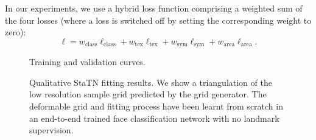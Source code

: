 \documentclass[runningheads]{llncs}
\begin{document}
In our experiments, we use a hybrid loss function comprising a weighted sum of the four losses (where a loss is switched off by setting the corresponding weight to zero):
\begin{equation}
    \ell = w_{\textrm{class}}\ell_{\textrm{class}} + w_{\textrm{tex}}\ell_{\textrm{tex}} + w_{\textrm{sym}}\ell_{\textrm{sym}} + w_{\textrm{area}}\ell_{\textrm{area}}.
\end{equation}













\begin{figure}[!t]
\centering
\noindent{}
\caption{Training and validation curves.}
\label{fig:curve}
\end{figure}

\begin{figure}[!t]
\centering
\noindent{}
\caption{Qualitative StaTN fitting results. We show a triangulation of the low resolution sample grid predicted by the grid generator. The deformable grid and fitting process have been learnt from scratch in an end-to-end trained face classification network with no landmark supervision.}
\label{fig:fitting}
\end{figure}
\end{document}
